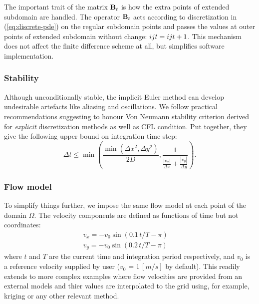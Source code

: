 \documentclass[conference,compsoc]{IEEEtran}
\begin{document}
The important trait of the matrix ${\bf B}_t$ is how the extra points of extended subdomain are handled. The operator ${\bf B}_t$ acts according to discretization in (\ref{eq:discrete-pde}) on the regular subdomain points and passes the values at outer points of extended subdomain without change: $\myu{i}{j}{t} = \myu{i}{j}{t+1}$. This mechanism does not affect the finite difference scheme at all, but simplifies software implementation.
\renewcommand{\myu}{}

\subsubsection{Stability}

Although unconditionally stable, the implicit Euler method can develop undesirable artefacts like aliasing and oscillations. We follow practical recommendations suggesting to honour Von Neumann stability criterion derived for \textit{explicit} discretization methods as well as CFL condition. Put together, they give the following upper bound on integration time step:
\begin{equation}
\Delta{t} \le \min\left(
\frac{\min\left(\Delta{x}^2, \Delta{y}^2\right)}{2 D},
\frac{1}{\frac{|v_x|}{\Delta{x}} + \frac{|v_y|}{\Delta{y}}}
\right).
\label{eq:time-step}
\end{equation}

\subsubsection{Flow model}
To simplify things further, we impose the same flow model at each point of the domain $\Omega$. The velocity components are defined as functions of time but not coordinates:
\begin{equation}
\begin{aligned}
& v_x = -v_0 \sin{(0.1 \, t / T - \pi)} \qquad \\
& v_y = -v_0 \sin{(0.2 \, t / T - \pi)}
\end{aligned}
\label{eq:flow}
\end{equation}
where $t$ and $T$ are the current time and integration period respectively, and $v_0$ is a reference velocity supplied by user ($v_0$ = $1\,[m/s]$ by default). 
This readily extends to more complex examples where flow velocities are provided from an external models and thier values are interpolated to the grid using, for example, kriging or any other relevant method.
\end{document}
